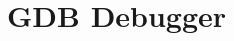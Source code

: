 \documentclass{article}
\author{Chris Wozniak}
\begin{document}
\section*{GDB Debugger}
	
\end{document}
